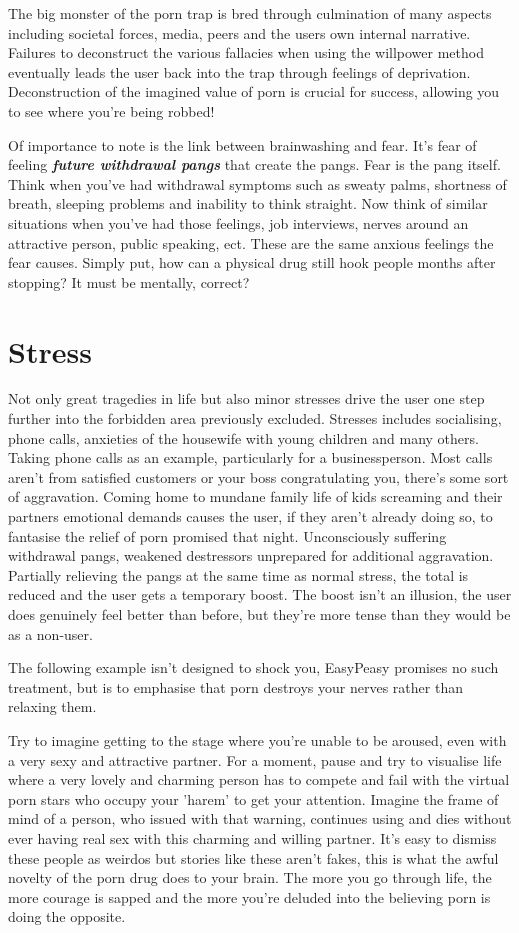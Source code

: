 \documentclass[easypeasy.tex]{subfiles}
\begin{document}
The big monster of the porn trap is bred through culmination of many aspects including societal forces, media, peers and the users own internal narrative. Failures to deconstruct the various fallacies when using the willpower method eventually leads the user back into the trap through feelings of deprivation. Deconstruction of the imagined value of porn is crucial for success, allowing you to see where you're being robbed!

Of importance to note is the link between brainwashing and fear. It's fear of feeling \textit{\textbf{future withdrawal pangs}} that create the pangs. Fear is the pang itself. Think when you've had withdrawal symptoms such as sweaty palms, shortness of breath, sleeping problems and inability to think straight. Now think of similar situations when you've had those feelings, job interviews, nerves around an attractive person, public speaking, ect. These are the same anxious feelings the fear causes. Simply put, how can a physical drug still hook people months after stopping? It must be mentally, correct?

\section{Stress}

Not only great tragedies in life but also minor stresses drive the user one step further into the forbidden area previously excluded. Stresses includes socialising, phone calls, anxieties of the housewife with young children and many others. Taking phone calls as an example, particularly for a businessperson. Most calls aren't from satisfied customers or your boss congratulating you, there's some sort of aggravation. Coming home to mundane family life of kids screaming and their partners emotional demands causes the user, if they aren't already doing so, to fantasise the relief of porn promised that night. Unconsciously suffering withdrawal pangs, weakened destressors unprepared for additional aggravation. Partially relieving the pangs at the same time as normal stress, the total is reduced and the user gets a temporary boost. The boost isn't an illusion, the user does genuinely feel better than before, but they're more tense than they would be as a non-user.

The following example isn't designed to shock you, EasyPeasy promises no such treatment, but is to emphasise that porn destroys your nerves rather than relaxing them.

Try to imagine getting to the stage where you're unable to be aroused, even with a very sexy and attractive partner. For a moment, pause and try to visualise life where a very lovely and charming person has to compete and fail with the virtual porn stars who occupy your 'harem' to get your attention. Imagine the frame of mind of a person, who issued with that warning, continues using and dies without ever having real sex with this charming and willing partner. It's easy to dismiss these people as weirdos but stories like these aren't fakes, this is what the awful novelty of the porn drug does to your brain. The more you go through life, the more courage is sapped and the more you're deluded into the believing porn is doing the opposite.
\end{document}
